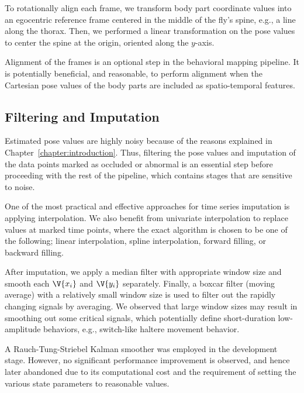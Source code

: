 To rotationally align each frame, we transform body part coordinate values into an egocentric reference frame centered in the middle of the fly's spine, e.g., a line along the thorax.
Then, we performed a linear transformation on the pose values to center the spine at the origin, oriented along the $y$-axis.

Alignment of the frames is an optional step in the behavioral mapping pipeline.
It is potentially beneficial, and reasonable, to perform alignment when the Cartesian pose values of the body parts are included as spatio-temporal features.

\subsection{Filtering and Imputation}
Estimated pose values are highly noisy because of the reasons explained in Chapter~\ref{chapter:introduction}.
Thus, filtering the pose values and imputation of the data points marked as occluded or abnormal is an essential step before proceeding with the rest of the pipeline, which contains stages that are sensitive to noise.

One of the most practical and effective approaches for time series imputation is applying interpolation.
We also benefit from univariate interpolation to replace values at marked time points, where the exact algorithm is chosen to be one of the following; linear interpolation, spline interpolation, forward filling, or backward filling.

After imputation, we apply a median filter with appropriate window size and smooth each $\V{x_i}$ and $\V{y_i}$ separately.
Finally, a boxcar filter (moving average) with a relatively small window size is used to filter out the rapidly changing signals by averaging.
We observed that large window sizes may result in smoothing out some critical signals, which potentially define short-duration low-amplitude behaviors, e.g., switch-like haltere movement behavior.

A Rauch-Tung-Striebel Kalman smoother \citep{rauch_maximum_1965} was employed in the development stage.
However, no significant performance improvement is observed, and hence later abandoned due to its computational cost and the requirement of setting the various state parameters to reasonable values.


